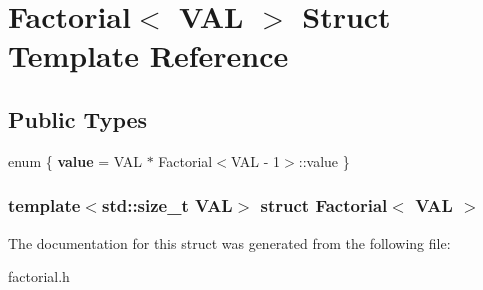 \hypertarget{structFactorial}{\section{\-Factorial$<$ \-V\-A\-L $>$ \-Struct \-Template \-Reference}
\label{structFactorial}
}
\subsection*{\-Public \-Types}
\begin{DoxyCompactItemize}
\item 
enum \{ {\bfseries value} =  \-V\-A\-L $\ast$ \-Factorial$<$\-V\-A\-L -\/ 1$>$\-:\-:value
 \}
\end{DoxyCompactItemize}
\subsubsection*{template$<$std\-::size\-\_\-t \-V\-A\-L$>$ struct Factorial$<$ V\-A\-L $>$}



\-The documentation for this struct was generated from the following file\-:\begin{DoxyCompactItemize}
\item 
factorial.\-h\end{DoxyCompactItemize}
